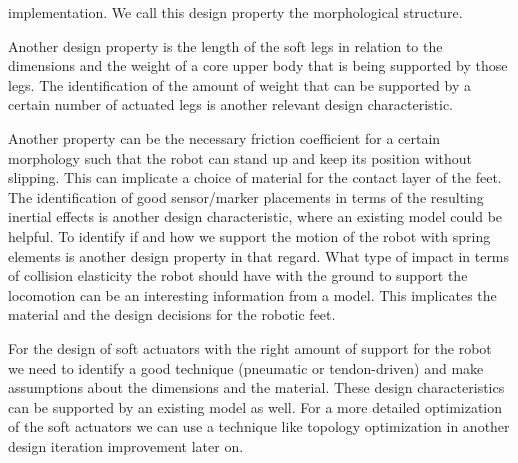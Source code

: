  implementation. We call this design property the morphological structure.
\par
Another design property is the length of the soft legs in relation to the dimensions and the weight of a core upper body that is being supported by those legs. The identification
 of the amount of weight that can be supported by a certain number of actuated legs is another relevant design characteristic.
%
\par
Another property can be the necessary friction coefficient for a certain morphology such that the robot can stand up and keep its position without slipping. This can implicate
 a choice of material for the contact layer of the feet.
%
The identification of good sensor/marker placements in terms of the resulting inertial effects is another design characteristic, where an existing model could be helpful.
%
To identify if and how we support the motion of the robot with spring elements is another design property in that regard. What type of impact in terms of collision elasticity 
the robot should have with the ground to support the locomotion can be an interesting information from a model. This implicates the material and the design decisions for the
 robotic feet.
%
\par
For the design of soft actuators with the right amount of support for the robot we need to identify a good technique (pneumatic or tendon-driven) and make assumptions about the dimensions
and the material. These design characteristics can be supported by an existing model as well. For a more detailed optimization of the soft actuators we can use a technique like
 topology optimization in another design iteration improvement later on.
%
